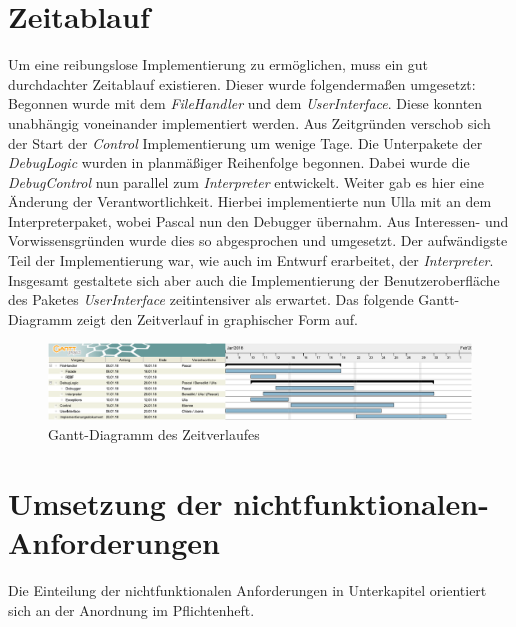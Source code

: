 \documentclass[parskip=full]{scrartcl}
\begin{document}
\section{Zeitablauf}
Um eine reibungslose Implementierung zu ermöglichen, muss ein gut durchdachter Zeitablauf existieren.
Dieser wurde folgendermaßen umgesetzt:\\
Begonnen wurde mit dem \textit{FileHandler} und dem \textit{UserInterface}. Diese konnten unabhängig voneinander implementiert werden.
Aus Zeitgründen verschob sich der Start der \textit{Control} Implementierung um wenige Tage.
Die Unterpakete der \textit{DebugLogic} wurden in planmäßiger Reihenfolge begonnen. Dabei wurde die \textit{DebugControl} nun parallel zum \textit{Interpreter} entwickelt.
Weiter gab es hier eine Änderung der Verantwortlichkeit. Hierbei implementierte nun Ulla mit an dem Interpreterpaket, wobei Pascal nun den Debugger übernahm.
Aus Interessen- und Vorwissensgründen wurde dies so abgesprochen und umgesetzt.
Der aufwändigste Teil der Implementierung war, wie auch im Entwurf erarbeitet, der \textit{Interpreter}. Insgesamt gestaltete sich aber auch die Implementierung der Benutzeroberfläche des Paketes \textit{UserInterface} zeitintensiver als erwartet.
Das folgende Gantt-Diagramm zeigt den Zeitverlauf in graphischer Form auf.
\begin{figure}[!h]
\centering
\includegraphics[width=1.0\textwidth]{ganntDiagramm_neu_crop.pdf}
\caption{Gantt-Diagramm des Zeitverlaufes}
\end{figure}

\section{Umsetzung der nichtfunktionalen-Anforderungen}

Die Einteilung der nichtfunktionalen Anforderungen in Unterkapitel orientiert sich an der Anordnung im Pflichtenheft.
\end{document}
